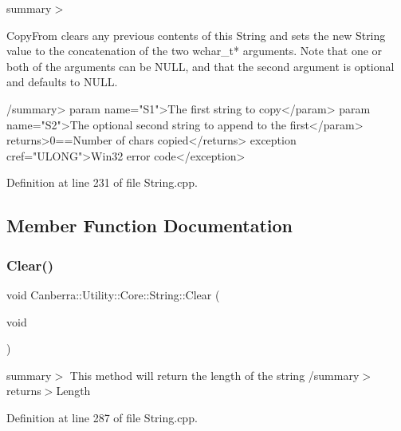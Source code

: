 summary$>$ \begin{DoxyVerb}CopyFrom clears any previous contents of this String and
sets the new String value to the concatenation of the
two wchar_t* arguments.  Note that one or both
of the arguments can be NULL, and that the second
argument is optional and defaults to NULL.

/summary>
param name="S1">The first string to copy</param>
param name="S2">The optional second string to append to the first</param>
returns>0==Number of chars copied</returns>
exception cref="ULONG">Win32 error code</exception>  \end{DoxyVerb}
 

Definition at line 231 of file String.\+cpp.



\subsection{Member Function Documentation}
\mbox{\label{class_canberra_1_1_utility_1_1_core_1_1_string_ab79c11c8c6e085fbdf15ce5531b724fe_ab79c11c8c6e085fbdf15ce5531b724fe}} 
\subsubsection{\texorpdfstring{Clear()}{Clear()}}
{\footnotesize\ttfamily void Canberra\+::\+Utility\+::\+Core\+::\+String\+::\+Clear (\begin{DoxyParamCaption}\item[{void}]{ }\end{DoxyParamCaption})}

summary$>$ This method will return the length of the string /summary$>$ returns$>$Length

Definition at line 287 of file String.\+cpp.

\mbox{\label{class_canberra_1_1_utility_1_1_core_1_1_string_ad036b29f6a6fe07763618830be440394_ad036b29f6a6fe07763618830be440394}} 
